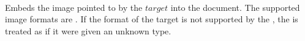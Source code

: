  \\

Embeds the image pointed to by the \inline$target$ into the document. The supported image formats are . If the format of the target is not supported by the , the  is treated as if it were given an unknown type. \\

\begin{examples}
\end{examples}

